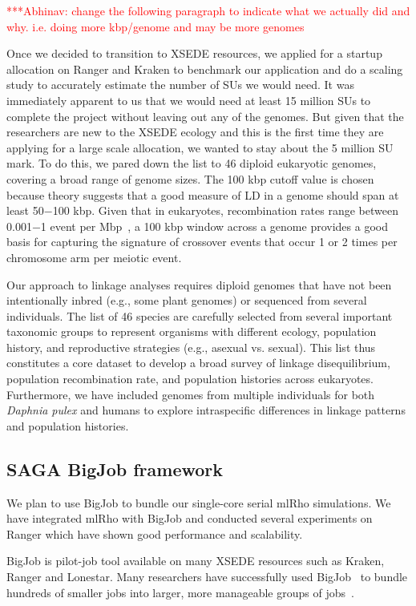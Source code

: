 \documentclass{sig-alternate}
\newcommand{\abhi}[1]{ {\textcolor{red} { ***Abhinav: #1 }}}
\newcommand{\abhi}[1]{ {}}
\begin{document}
\abhi{change the following paragraph to indicate what we actually did and why. i.e. doing more kbp/genome and may be more genomes}

Once we decided to transition to XSEDE resources, we applied for a startup allocation on Ranger and Kraken to benchmark our application and do a scaling study to accurately estimate the number of SUs we would need. It was immediately apparent to us that we would need at least 15 million SUs to complete the project without leaving out any of the genomes. But given that the researchers are new to the XSEDE ecology and this is the first time they are applying for a large scale allocation, we wanted to stay about the 5 million SU mark. To do this, we pared down the list to 46 diploid eukaryotic genomes, covering a broad range of genome sizes.
The 100 kbp cutoff value is chosen because theory suggests that a good measure
of LD in a genome should span at least 50$-$100 kbp. Given that in eukaryotes, recombination rates range
between 0.001$-$1 event per Mbp~\cite{annurev-genom-082410-101412}, a 100 kbp window across a genome provides
a good basis for capturing the signature of crossover events that occur 1 or 2 times per chromosome arm per
meiotic event.

Our approach to linkage analyses requires diploid genomes that have not been intentionally inbred  (e.g., some plant genomes) or sequenced from several individuals. The list of 46 species are carefully selected from several important taxonomic groups to represent organisms with different ecology, population history, and reproductive strategies  (e.g., asexual vs. sexual). This list  thus constitutes a core dataset to develop a broad survey of linkage disequilibrium, population recombination rate, and population histories across eukaryotes. Furthermore, we have included genomes from multiple individuals for both {\it Daphnia pulex} and humans to explore intraspecific differences in linkage patterns and population histories. 

\subsection{SAGA BigJob framework}
\label{sec:bigjob}

We plan to use BigJob to bundle our single-core serial mlRho simulations. We have integrated mlRho with BigJob and conducted several experiments on Ranger which have shown good performance and scalability. 

BigJob is pilot-job tool available on many XSEDE resources such as Kraken, Ranger and Lonestar. Many researchers have successfully used BigJob~\cite{bigjob_web} to bundle hundreds of smaller jobs into larger, more manageable groups of jobs~\cite{Luckow:2008fp, async_repex11}. 
\end{document}
